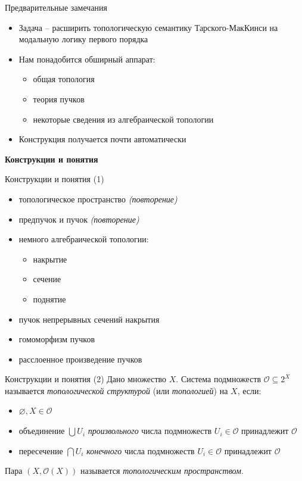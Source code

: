 \documentclass{beamer}
\begin{document}
\begin{frame}{Предварительные замечания}
\begin{itemize}
	\item Задача -- расширить топологическую семантику Тарского-МакКинси на модальную логику первого порядка
	\medskip
	\item Нам понадобится обширный аппарат:
		\medskip
		\begin{itemize}
			\item общая топология
			\item теория пучков
			\item некоторые сведения из алгебраической топологии
		\end{itemize}
	\medskip
	\item Конструкция получается почти автоматически
\end{itemize}
\end{frame}



\begin{frame}{}
\begin{center}
	\textbf{Конструкции и понятия}
\end{center}
\end{frame}

\begin{frame}{Конструкции и понятия (1)}
\begin{itemize}
	\item топологическое пространство {\small \textit{(повторение)}}
	\item предпучок и пучок {\small \textit{(повторение)}}
	\item немного алгебраической топологии:
		\medskip
		\begin{itemize}
			\item накрытие
			\item сечение
			\item поднятие
		\end{itemize}
		\medskip
	\item пучок непрерывных сечений накрытия
	\item гомоморфизм пучков
	\item расслоенное произведение пучков
\end{itemize}
\end{frame}

\begin{frame}{Конструкции и понятия (2)}
Дано множество $X$. Система подмножеств $\mathcal{O} \subseteq 2^X$ называется \textit{топологической структурой} (или \textit{топологией}) на $X$, если:\\
\bigskip
\begin{itemize}
	\item $\varnothing, X \in \mathcal{O}$
	\item объединение $\bigcup U_i$ \textit{произвольного} числа подмножеств $U_i \in \mathcal{O}$ принадлежит $\mathcal{O}$
	\item пересечение $\bigcap U_i$ \textit{конечного} числа подмножеств $U_i \in \mathcal{O}$ принадлежит $\mathcal{O}$
\end{itemize}
\bigskip
Пара $(X, \mathcal{O}(X))$ называется \textit{топологическим пространством}.
\end{frame}
\end{document}
